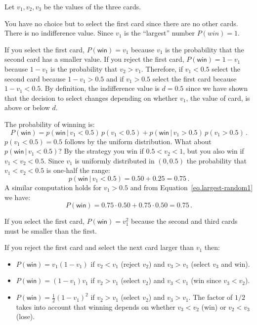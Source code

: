 Let $v_1,v_2,v_3$ be the values of the three cards.

 You have no choice but to select the first card since there are no other cards. There is no indifference value. Since $v_1$ is the ``largest'' number $P({win})=1$.

 If you select the first card, $P(\textsf{win})=v_1$ because $v_1$ is the probability that the second card has a smaller value. If you reject the first card, $P(\textsf{win})=1-v_1$ because $1-v_1$ is the probability that $v_2>v_1$. Therefore, if $v_1<0.5$ select the second card because $1-v_1>0.5$ and if $v_1>0.5$ select the first card because $1-v_1<0.5$. By definition, the indifference value is $d=0.5$ since we have shown that the decision to select changes depending on whether $v_1$, the value of card, is above or below $d$.

The probability of winning is:
\begin{equation}\label{eq.largest-random1}
P(\textsf{win}) = p(\textsf{win} \,|\,v_1<0.5)\,p(v_1<0.5)+ p(\textsf{win}\,|\,v_1>0.5)\,p(v_1>0.5)\,.
\end{equation}
$p(v_1<0.5)=0.5$ follows by the uniform distribution. What about $p(\textsf{win} \,|\,v_1<0.5)$? By the strategy you win if $0.5<v_2<1$, but you also win if $v_1<v_2<0.5$. Since $v_1$ is uniformly distributed in $(0,0.5)$ the probability that $v_1<v_2<0.5$ is one-half the range:
\[
p(\textsf{win} \,|\,v_1<0.5)=0.50+0.25=0.75\,.
\]
A similar computation holds for $v_1>0.5$ and from Equation~\ref{eq.largest-random1} we have:
\[
P(\textsf{win})=0.75\cdot 0.50 + 0.75\cdot 0.50=0.75\,.
\]


If you select the first card, $P(\textsf{win})=v_1^2$ because the second and third cards must be smaller than the first.

If you reject the first card and select the next card larger than $v_1$ then:
\begin{itemize}
\item $P(\textsf{win})=v_1(1-v_1)$ if $v_2<v_1$ (reject $v_2$) and $v_3>v_1$ (select $v_3$ and win).
\item $P(\textsf{win})=(1-v_1)v_1$ if $v_2>v_1$ (select $v_2$) and $v_3<v_1$ (win since $v_3<v_2$).
\item $P(\textsf{win})=\frac{1}{2}(1-v_1)^2$ if $v_2>v_1$ (select $v_2$) and $v_3>v_1$. The factor of $1/2$ takes into account that winning depends on whether $v_3<v_2$ (win) or $v_2<v_3$ (lose).
\end{itemize}

